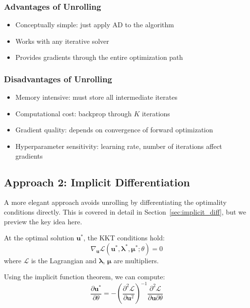\subsubsection{Advantages of Unrolling}

\begin{itemize}
    \item Conceptually simple: just apply AD to the algorithm
    \item Works with any iterative solver
    \item Provides gradients through the entire optimization path
\end{itemize}

\subsubsection{Disadvantages of Unrolling}

\begin{itemize}
    \item Memory intensive: must store all intermediate iterates
    \item Computational cost: backprop through $K$ iterations
    \item Gradient quality: depends on convergence of forward optimization
    \item Hyperparameter sensitivity: learning rate, number of iterations affect gradients
\end{itemize}

\subsection{Approach 2: Implicit Differentiation}

A more elegant approach avoids unrolling by differentiating the optimality conditions directly. This is covered in detail in Section~\ref{sec:implicit_diff}, but we preview the key idea here.

At the optimal solution $\mathbf{u}^*$, the KKT conditions hold:
\begin{equation}
\nabla_{\mathbf{u}} \mathcal{L}(\mathbf{u}^*, \boldsymbol{\lambda}^*, \boldsymbol{\mu}^*; \theta) = 0
\end{equation}
where $\mathcal{L}$ is the Lagrangian and $\boldsymbol{\lambda}$, $\boldsymbol{\mu}$ are multipliers.

Using the implicit function theorem, we can compute:
\begin{equation}
\frac{\partial \mathbf{u}^*}{\partial \theta} = -\left( \frac{\partial^2 \mathcal{L}}{\partial \mathbf{u}^2} \right)^{-1} \frac{\partial^2 \mathcal{L}}{\partial \mathbf{u} \partial \theta}
\end{equation}

